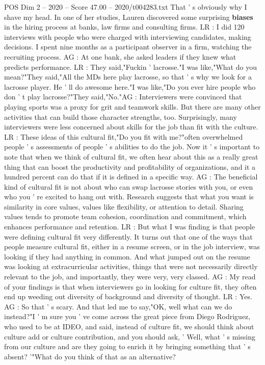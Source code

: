 \begin{textsample}{POS Dim 2 – 2020 – Score 47.00 – 2020/t004283.txt}
That ' s obviously why I shave my head.
In one of her studies, Lauren discovered some surprising \textbf{biases} in the hiring process at banks, law firms and consulting firms.
LR : I did 120 interviews with people who were charged with interviewing candidates, making decisions.
I spent nine months as a participant observer in a firm, watching the recruiting process.
AG : At one bank, she asked leaders if they knew what predicts performance.
LR : They said,"Fuckin ' lacrosse."I was like,"What do you mean?"They said,"All the MDs here play lacrosse, so that ' s why we look for a lacrosse player.
He ' ll do awesome here."I was like,"Do you ever hire people who don ' t play lacrosse?"They said,"No."AG : Interviewers were convinced that playing sports was a proxy for grit and teamwork skills.
But there are many other activities that can build those character strengths, too.
Surprisingly, many interviewers were less concerned about skills for the job than fit with the culture.
LR : These ideas of this cultural fit,"Do you fit with me?"often overwhelmed people ' s assessments of people ' s abilities to do the job.
Now it ' s important to note that when we think of cultural fit, we often hear about this as a really great thing that can boost the productivity and profitability of organizations, and it a hundred percent can do that if it is defined in a specific way.
AG : The beneficial kind of cultural fit is not about who can swap lacrosse stories with you, or even who you ' re excited to hang out with.
Research suggests that what you want is similarity in core values, values like flexibility, or attention to detail.
Sharing values tends to promote team cohesion, coordination and commitment, which enhances performance and retention.
LR : But what I was finding is that people were defining cultural fit very differently.
It turns out that one of the ways that people measure cultural fit, either in a resume screen, or in the job interview, was looking if they had anything in common.
And what jumped out on the resume was looking at extracurricular activities, things that were not necessarily directly relevant to the job, and importantly, they were very, very classed.
AG : My read of your findings is that when interviewers go in looking for culture fit, they often end up weeding out diversity of background and diversity of thought.
LR : Yes.
AG : So that ' s scary.
And that led me to say,"OK, well what can we do instead?"I ' m sure you ' ve come across the great piece from Diego Rodriguez, who used to be at IDEO, and said, instead of culture fit, we should think about culture add or culture contribution, and you should ask, ' Well, what ' s missing from our culture and are they going to enrich it by bringing something that ' s absent? '"What do you think of that as an alternative?

\end{textsample}
